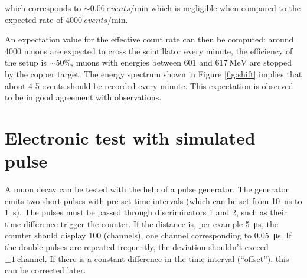 which corresponds to $\sim \SI{0.06}{events\per\minute}$ which is negligible when compared to the expected rate of $\SI{4000}{events\per\minute}$.

An expectation value for the effective count rate can then be computed: around 4000 muons are expected to cross the scintillator every minute, the efficiency of the setup is $\sim 50\%$, muons with energies between $601$ and $\SI{617}{\mega\electronvolt}$ are stopped by the copper target. The energy spectrum shown in Figure \ref{fig:shift} implies that about 4-5 events should be recorded every minute. This expectation is observed to be in good agreement with observations.

\section{Electronic test with simulated pulse}

A muon decay can be tested with the help of a pulse generator. The generator emits two short pulses with pre-set time intervals (which can be set from \SI{10}{\nano\second} to \SI{1}{\second}). The pulses must be passed through discriminators 1 and 2, such as their time difference trigger the counter. If the distance is, per example \SI{5}{\micro\second}, the counter should display 100 (channels), one channel corresponding to \SI{0.05}{\micro\second}. If the double pulses are repeated frequently, the deviation shouldn't exceed $\pm\SI{1}{\text{channel}}$. If there is a constant difference in the time interval (``offset''), this can be corrected later.


